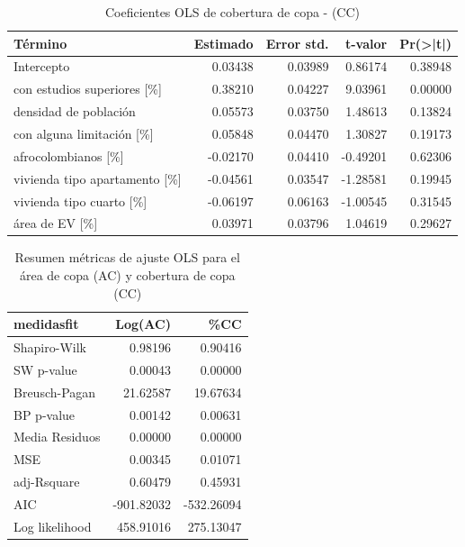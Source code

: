 \documentclass[12pt,a4paper,oneside, openany]{book}
\theoremstyle{definition}
\theoremstyle{definition}
\theoremstyle{definition}
\theoremstyle{remark}
\begin{document}
\begin{table}[H]

\caption{\label{tab:coef-lm-cobertura}Coeficientes OLS de cobertura de copa - (CC)}
\centering
\begin{tabular}{lrrrr}
\toprule
Término & Estimado & Error std. & t-valor & Pr(>|t|)\\
\midrule
Intercepto & 0.03438 & 0.03989 & 0.86174 & 0.38948\\
con estudios superiores [\%] & 0.38210 & 0.04227 & 9.03961 & 0.00000\\
densidad de población & 0.05573 & 0.03750 & 1.48613 & 0.13824\\
con alguna limitación [\%] & 0.05848 & 0.04470 & 1.30827 & 0.19173\\
afrocolombianos [\%] & -0.02170 & 0.04410 & -0.49201 & 0.62306\\
\addlinespace
vivienda tipo apartamento [\%] & -0.04561 & 0.03547 & -1.28581 & 0.19945\\
vivienda tipo cuarto [\%] & -0.06197 & 0.06163 & -1.00545 & 0.31545\\
área de EV [\%] & 0.03971 & 0.03796 & 1.04619 & 0.29627\\
\bottomrule
\end{tabular}
\end{table}

\begin{table}[H]

\caption{\label{tab:ajuste-lmcopa-pob-predios}Resumen métricas de ajuste OLS para el área de copa (AC) y cobertura de copa (CC) }
\centering
\begin{tabular}{lrr}
\toprule
medidasfit & Log(AC) & \%CC\\
\midrule
Shapiro-Wilk & 0.98196 & 0.90416\\
SW p-value & 0.00043 & 0.00000\\
Breusch-Pagan & 21.62587 & 19.67634\\
BP p-value & 0.00142 & 0.00631\\
Media Residuos & 0.00000 & 0.00000\\
\addlinespace
MSE & 0.00345 & 0.01071\\
adj-Rsquare & 0.60479 & 0.45931\\
AIC & -901.82032 & -532.26094\\
Log likelihood & 458.91016 & 275.13047\\
\bottomrule
\end{tabular}
\end{table}
\end{document}
